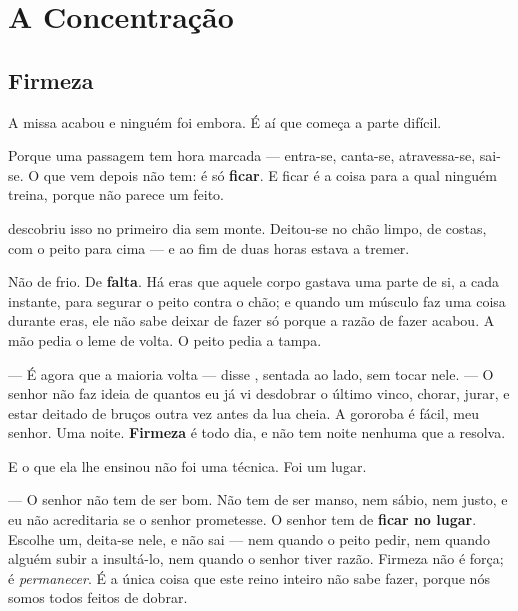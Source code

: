 \documentclass[livro.tex]{subfiles}
\begin{document}

\part{A Concentração}

\chapter{Firmeza}

A missa acabou e ninguém foi embora. É aí que começa a parte difícil.

Porque uma passagem tem hora marcada --- entra-se, canta-se, atravessa-se, sai-se. O que vem
depois não tem: é só \textbf{ficar}. E ficar é a coisa para a qual ninguém treina, porque não
parece um feito.

\medskip

\Ven descobriu isso no primeiro dia sem monte. Deitou-se no chão limpo, de costas, com o peito
para cima --- e ao fim de duas horas estava a tremer.

Não de frio. De \textbf{falta}. Há eras que aquele corpo gastava uma parte de si, a cada
instante, para segurar o peito contra o chão; e quando um músculo faz uma coisa durante eras,
ele não sabe deixar de fazer só porque a razão de fazer acabou. A mão pedia o leme de volta. O
peito pedia a tampa.

--- É agora que a maioria volta --- disse \Qui , sentada ao lado, sem tocar nele. --- O senhor
não faz ideia de quantos eu já vi desdobrar o último vinco, chorar, jurar, e estar deitado de
bruços outra vez antes da lua cheia. A gororoba é fácil, meu senhor. Uma noite. \textbf{Firmeza}
é todo dia, e não tem noite nenhuma que a resolva.

\medskip

E o que ela lhe ensinou não foi uma técnica. Foi um lugar.

--- O senhor não tem de ser bom. Não tem de ser manso, nem sábio, nem justo, e eu não
acreditaria se o senhor prometesse. O senhor tem de \textbf{ficar no lugar}. Escolhe um, deita-se
nele, e não sai --- nem quando o peito pedir, nem quando alguém subir a insultá-lo, nem quando o
senhor tiver razão. Firmeza não é força; é \emph{permanecer}. É a única coisa que este reino
inteiro não sabe fazer, porque nós somos todos feitos de dobrar.
\end{document}
